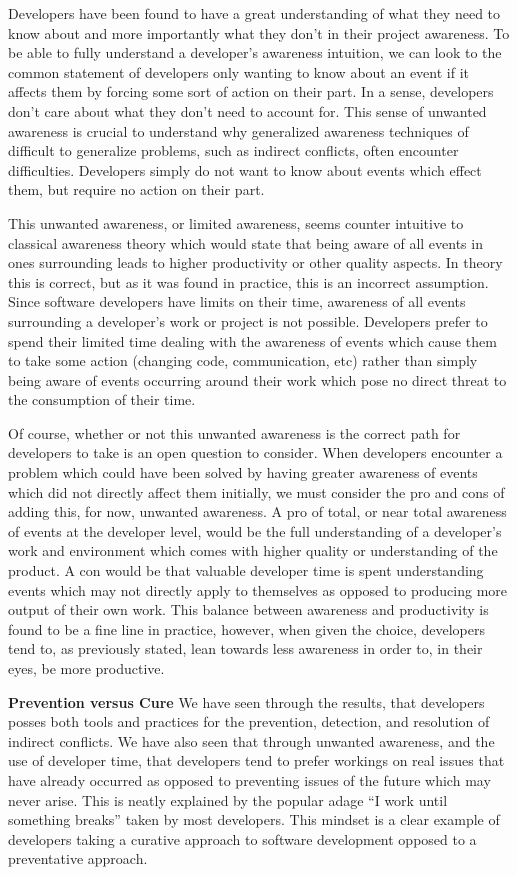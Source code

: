 \documentclass[conference]{IEEEtran}
\begin{document}
Developers have been found to have a great understanding of what they need to know about and more importantly what they don't in
their project awareness. To be able to fully understand a developer's awareness intuition, we can look to the common statement of
developers only wanting to know about an event if it affects them by forcing some sort of action on their part. In a sense, developers
don't care about what they don't need to account for. This sense of unwanted awareness is crucial to understand why generalized
awareness techniques of difficult to generalize problems, such as indirect conflicts, often encounter difficulties. 
Developers simply do not want to know about events which effect them, but require no action on their part. 

This unwanted awareness, or limited awareness, seems counter intuitive to classical awareness theory which would state that
being aware of all events in ones surrounding leads to higher productivity or other quality aspects. In theory this is correct,
but as it was found in practice, this is an incorrect assumption. Since software developers have limits on their time, awareness of
all events surrounding a developer's work or project is not possible. Developers prefer to spend their limited time dealing with
the awareness of events which cause them to take some action (changing code, communication, etc) rather than simply being aware
of events occurring around their work which pose no direct threat to the consumption of their time.

Of course, whether or not this unwanted awareness is the correct path for developers to take is an open question to consider. When
developers encounter a problem which could have been solved by having greater awareness of events which did not directly affect
them initially, we must consider the pro and cons of adding this, for now, unwanted awareness. A pro of total, or near total
awareness of events at the developer level, would be the full understanding of a developer's work and environment which comes
with higher quality or understanding of the product. 
A con would be that valuable developer time is spent understanding events which may not directly apply to themselves as opposed to 
producing more output of their own work. This balance between awareness and productivity is found to be a fine line in practice,
however, when given the choice, developers tend to, as previously stated, lean towards less awareness in order to, in their eyes,
be more productive.

\textbf{Prevention versus Cure} We have seen through the results, that developers posses both tools and practices for the prevention,
detection, and resolution of indirect conflicts. We have also seen that through unwanted awareness, and the use of developer time,
that developers tend to prefer workings on real issues that have already occurred as opposed to preventing issues of the future which
may never arise. This is neatly explained by the popular adage ``I work until something breaks'' taken by most developers. This mindset
is a clear example of developers taking a curative approach to software development opposed to a preventative approach.
\end{document}
